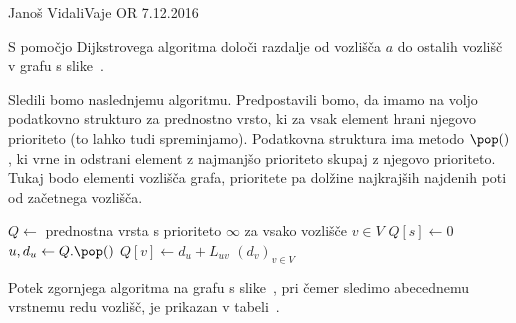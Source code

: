 \begin{naloga}{Janoš Vidali}{Vaje OR 7.12.2016}
\begin{vprasanje}
S pomočjo Dijkstrovega algoritma
določi razdalje od vozlišča $a$ do ostalih vozlišč
v grafu s slike~\fig.

\begin{slika}
\pgfslika
{}
\end{slika}
\end{vprasanje}


\begin{odgovor}
Sledili bomo naslednjemu algoritmu.
Predpostavili bomo,
da imamo na voljo podatkovno strukturo za prednostno vrsto,
ki za vsak element hrani njegovo prioriteto (to lahko tudi spreminjamo).
Podatkovna struktura ima metodo $\pop()$,
ki vrne in odstrani element z najmanjšo prioriteto
skupaj z njegovo prioriteto.
Tukaj bodo elementi vozlišča grafa,
prioritete pa dolžine najkrajših najdenih poti od začetnega vozlišča.
\begin{small}
\begin{algorithmic}
	\State $Q \gets$ prednostna vrsta
        s prioriteto $\infty$ za vsako vozlišče $v \in V$
	\State $Q[s] \gets 0$
		\State $u, d_u \gets Q.\pop()$
				\State $Q[v] \gets d_u + L_{uv}$
			\EndIf
		\EndFor
	\EndWhile
    \State \Return $(d_v)_{v \in V}$
\EndFunction
\end{algorithmic}
\end{small}
%
Potek zgornjega algoritma na grafu s slike~\fig,
pri čemer sledimo abecednemu vrstnemu redu vozlišč,
je prikazan v tabeli~\tab.



\end{odgovor}
\end{naloga}
